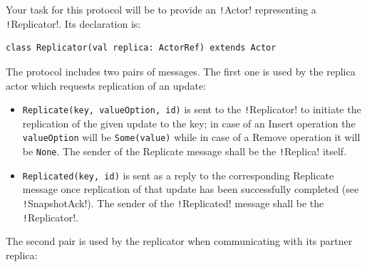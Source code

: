 \documentclass{article}
\begin{document}
Your task for this protocol will be to provide an \texttt!Actor! representing a \texttt!Replicator!. Its declaration is:

\begin{verbatim}
class Replicator(val replica: ActorRef) extends Actor 
\end{verbatim}

The protocol includes two pairs of messages. The first one is used by the replica actor which requests replication of an update:

\begin{itemize}
    \item \texttt{Replicate(key, valueOption, id)} is sent to the \texttt!Replicator! to initiate the replication of the given update to the key; in case of an Insert operation the \texttt{valueOption} will be \texttt{Some(value)} while in case of a Remove operation it will be \texttt{None}. The sender of the Replicate message shall be the \texttt!Replica! itself.
    \item \texttt{Replicated(key, id)} is sent as a reply to the corresponding Replicate message once replication of that update has been successfully completed (see \texttt!SnapshotAck!). The sender of the \texttt!Replicated! message shall be the \texttt!Replicator!.
\end{itemize}
The second pair is used by the replicator when communicating with its partner replica:
\end{document}
